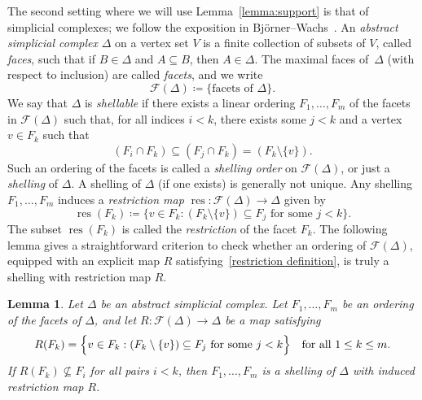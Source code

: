 \documentclass[noamsfonts,10pt]{amsart}
\newcommand{\F}{\mathcal{F}}
\newcommand{\res}{\operatorname{res}}
\newcommand{\1}{\mathbf{1}}
\theoremstyle{plain}
\newtheorem{lemma}[theorem]{Lemma}
\theoremstyle{definition}
\numberwithin{equation}{section}
\begin{document}
The second setting where we will use Lemma~\ref{lemma:support} is that of simplicial complexes; we follow the exposition in Bj\"orner--Wachs~\cite{BjornerWachs}.
An \emph{abstract simplicial complex} $\Delta$ on a vertex set $V$ is a finite collection of subsets of $V$, called \emph{faces}, such that if $B \in \Delta$ and $A \subseteq B$, then $A \in \Delta$.
The maximal faces of~$\Delta$ (with respect to inclusion) are called \emph{facets}, and we write
    \begin{equation}
        \label{F(Delta)}
        \F(\Delta) \coloneqq \{ \text{facets of $\Delta$} \}.
    \end{equation}
We say that $\Delta$ is \emph{shellable} if there exists a linear ordering $F_1, \ldots, F_m$ of the facets in $\F(\Delta)$ such that, for all indices $i < k$, there exists some $j < k$ and a vertex $v \in F_k$ such that
    \begin{equation}
        \label{shelling condition}
        (F_i \cap F_k) \subseteq (F_j \cap F_k) = (F_k \setminus \{v\}).
    \end{equation}
Such an ordering of the facets is called a \emph{shelling order} on $\F(\Delta)$, or just a \emph{shelling} of $\Delta$.
A shelling of $\Delta$ (if one exists) is generally not unique.
Any shelling $F_1, \ldots, F_m$ induces a \emph{restriction map} $\res : \F(\Delta) \longrightarrow \Delta$ given by
    \begin{equation}
        \label{restriction definition}
        \res(F_k) \coloneqq \Big\{ v \in F_k : (F_k \setminus \{v\}) \subseteq F_j \text{ for some $j < k$} \Big\}.
    \end{equation}
The subset $\res(F_k)$ is called the \emph{restriction} of the facet $F_k$.
The following lemma gives a straightforward criterion to check whether an ordering of $\F(\Delta)$, equipped with an explicit map $R$ satisfying~\eqref{restriction definition}, is truly a shelling with restriction map $R$.

\begin{lemma}
    \label{lemma:shelling criterion}
    Let $\Delta$ be an abstract simplicial complex.
    Let $F_1, \ldots, F_m$ be an ordering of the facets of $\Delta$, and let $R: \F(\Delta) \longrightarrow \Delta$ be a map satisfying
    \begin{equation}
        \label{R property}
        R(F_k) = \Big\{ v \in F_k : (F_k \setminus \{v\}) \subseteq F_j \textup{ for some } j < k \Big\} \quad \textup{for all } 1 \leq k \leq m.
    \end{equation}
    If $R(F_k) \not\subseteq F_i$ for all pairs $i<k$, then $F_1, \ldots, F_m$ is a shelling of $\Delta$ with induced restriction map $R$.
\end{lemma}
\end{document}
